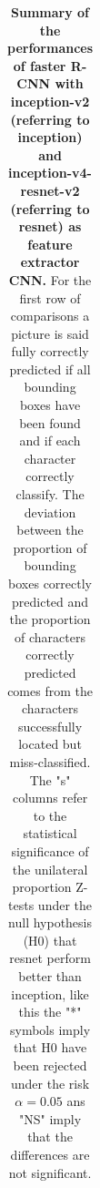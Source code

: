 \documentclass[12pt, french, a4paper]{article} %
\begin{document}
\begin{table}[H]
\begin{tabular}{c|l|l|l|l|l|l|l|l|l|}
\end{tabular}
\caption{ \textbf{Summary of the performances of faster \gls{R-CNN} with inception-v2 (referring to inception) and inception-v4-resnet-v2 (referring to resnet) as feature extractor CNN.} For the first row of comparisons a picture is said fully correctly predicted if all bounding boxes have been found and if each character correctly classify. The deviation between the proportion of bounding boxes correctly predicted and the proportion of characters correctly predicted comes from the characters successfully located but miss-classified. The "s" columns refer to the statistical significance of the unilateral proportion Z-tests under the null hypothesis (H0) that resnet perform better than inception, like this the "*" symbols imply that H0 have been rejected under the risk $\alpha = 0.05$ ans "NS" imply that the differences are not significant.}
\label{Table_inception_resnet}
\end{table}
\end{document}
